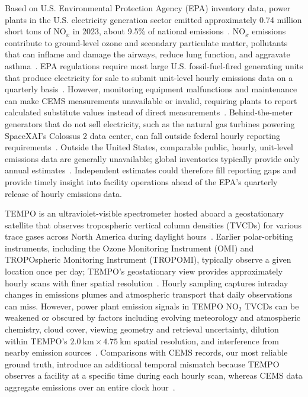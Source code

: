 \documentclass[sigconf,nonacm]{acmart}
\newcommand{\NOx}{NO$_x$}
\begin{document}
Based on U.S. Environmental Protection Agency (EPA) inventory data, power plants
in the U.S. electricity generation sector emitted approximately 0.74 million
short tons of \NOx{} in 2023, about 9.5\% of national
emissions~\cite{epa2026emissionsTrends}. \NOx{} emissions contribute to
ground-level ozone and secondary particulate matter, pollutants that can
inflame and damage the airways, reduce lung function, and aggravate
asthma~\cite{epa2016noxHealth}. EPA regulations require most large U.S.
fossil-fuel-fired generating units that produce electricity for sale to submit
unit-level hourly emissions data on a quarterly basis~\cite{epa2026powerMonitoring}.
However, monitoring equipment malfunctions and maintenance can make CEMS
measurements unavailable or invalid, requiring plants to report calculated
substitute values instead of direct measurements~\cite{epa2021substitute}.
Behind-the-meter generators that do not sell electricity, such as the natural gas
turbines powering SpaceXAI's Colossus 2 data center, can fall outside federal hourly
reporting requirements~\cite{gauld2026dataCenter}.
Outside the United States, comparable public, hourly, unit-level emissions data are generally unavailable;
global inventories typically provide only annual estimates~\cite{huang2026detectability}. Independent estimates could therefore
fill reporting gaps and provide timely insight into facility operations ahead of the EPA's quarterly release
of hourly emissions data.

TEMPO is an ultraviolet-visible spectrometer hosted aboard a geostationary satellite
that observes tropospheric vertical column densities (TVCDs) for various trace gases
across North America during daylight hours~\cite{zoogman2017tempo}. Earlier polar-orbiting
instruments, including the Ozone Monitoring Instrument (OMI) and TROPOspheric Monitoring
Instrument (TROPOMI), typically observe a given location once per day; TEMPO's geostationary
view provides approximately hourly scans with finer spatial
resolution~\cite{levelt2006omi,veefkind2012tropomi,zoogman2017tempo}. Hourly sampling
captures intraday changes in emissions plumes and atmospheric transport that daily
observations can miss. However, power plant emission signals in TEMPO NO$_2$ TVCDs can be weakened
or obscured by factors including evolving meteorology and atmospheric chemistry, cloud cover,
viewing geometry and retrieval uncertainty, dilution within TEMPO's \(2.0~\mathrm{km} \times 4.75~\mathrm{km}\) spatial resolution, and interference from nearby emission sources~\cite{tempo2026userGuide,huang2026detectability,gauld2026dataCenter}.
Comparisons with CEMS records, our most reliable ground truth, introduce an
additional temporal mismatch because TEMPO observes a facility at a specific time during each hourly scan,
whereas CEMS data aggregate emissions over an entire clock hour~\cite{tempo2026userGuide,epa2026powerMonitoring}.
\end{document}
